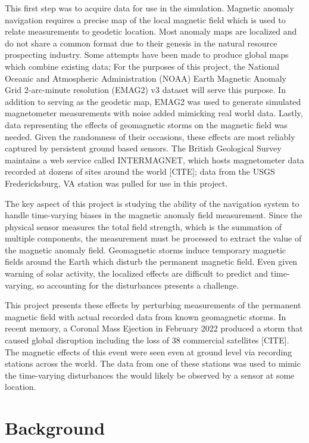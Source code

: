 \documentclass[conf]{new-aiaa}
\begin{document}
This first step was to acquire data for use in the simulation. Magnetic anomaly navigation requires a precise map of the local magnetic field which is used to relate measurements to geodetic location. Most anomaly maps are localized and do not share a common format due to their genesis in the natural resource prospecting industry. Some attempts have been made to produce global maps which combine existing data; For the purposes of this project, the National Oceanic and Atmospheric Administration (NOAA) Earth Magnetic Anomaly Grid 2-arc-minute resolution (EMAG2) v3 dataset will serve this purpose. In addition to serving as the geodetic map, EMAG2 was used to generate simulated magnetometer measurements with noise added mimicking real world data. Lastly, data representing the effects of geomagnetic storms on the magnetic field was needed. Given the randomness of their occasions, these effects are most reliably captured by persistent ground based sensors. The British Geological Survey maintains a web service called INTERMAGNET, which hosts magnetometer data recorded at dozens of sites around the world [CITE]; data from the USGS Fredericksburg, VA station was pulled for use in this project.

The key aspect of this project is studying the ability of the navigation system to handle time-varying biases in the magnetic anomaly field measurement. Since the physical sensor measures the total field strength, which is the summation of multiple components, the measurement must be processed to extract the value of the magnetic anomaly field. Geomagnetic storms induce temporary magnetic fields around the Earth which disturb the permanent magnetic field. Even given warning of solar activity, the localized effects are difficult to predict and time-varying, so accounting for the disturbances presents a challenge.

This project presents these effects by perturbing measurements of the permanent magnetic field with actual recorded data from known geomagnetic storms. In recent memory, a Coronal Mass Ejection in February 2022 produced a storm that caused global disruption including the loss of 38 commercial satellites [CITE]. The magnetic effects of this event were seen even at ground level via recording stations across the world. The data from one of these stations was used to mimic the time-varying disturbances the would likely be observed by a sensor at some location.  

\section{Background}
\end{document}
